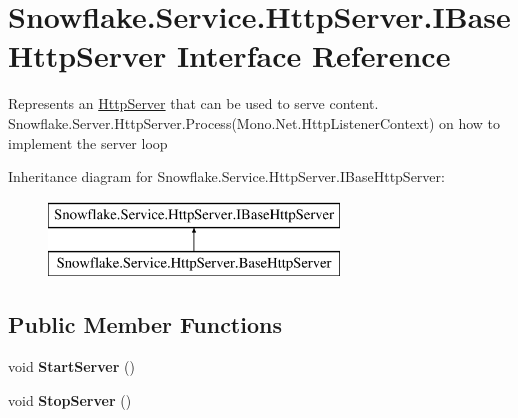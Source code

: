 \hypertarget{interface_snowflake_1_1_service_1_1_http_server_1_1_i_base_http_server}{}\section{Snowflake.\+Service.\+Http\+Server.\+I\+Base\+Http\+Server Interface Reference}
\label{interface_snowflake_1_1_service_1_1_http_server_1_1_i_base_http_server}


Represents an \hyperlink{namespace_snowflake_1_1_service_1_1_http_server}{Http\+Server} that can be used to serve content. Snowflake.\+Server.\+Http\+Server.\+Process(\+Mono.\+Net.\+Http\+Listener\+Context) on how to implement the server loop  


Inheritance diagram for Snowflake.\+Service.\+Http\+Server.\+I\+Base\+Http\+Server\+:\begin{figure}[H]
\begin{center}
\leavevmode
\includegraphics[height=2.000000cm]{interface_snowflake_1_1_service_1_1_http_server_1_1_i_base_http_server}
\end{center}
\end{figure}
\subsection*{Public Member Functions}
\begin{DoxyCompactItemize}
\item 
\hypertarget{interface_snowflake_1_1_service_1_1_http_server_1_1_i_base_http_server_a6c5176f890ae4f1b0e8e7301e11f173d}{}void {\bfseries Start\+Server} ()\label{interface_snowflake_1_1_service_1_1_http_server_1_1_i_base_http_server_a6c5176f890ae4f1b0e8e7301e11f173d}

\item 
\hypertarget{interface_snowflake_1_1_service_1_1_http_server_1_1_i_base_http_server_ae05a22e1d5ae8cacf6d825c080e56020}{}void {\bfseries Stop\+Server} ()\label{interface_snowflake_1_1_service_1_1_http_server_1_1_i_base_http_server_ae05a22e1d5ae8cacf6d825c080e56020}

\end{DoxyCompactItemize}


